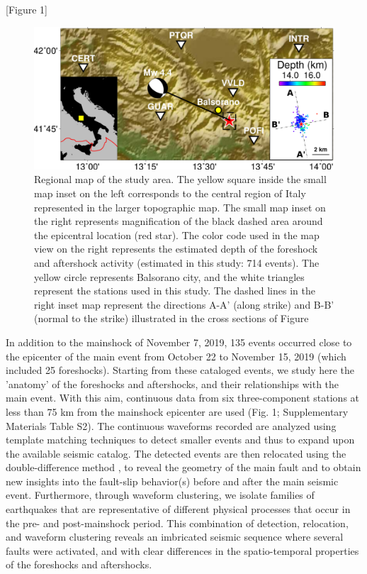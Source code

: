 \documentclass[a4paper,12pt,twoside]{article}
\begin{document}
\begin{center}
   [Figure 1]
\end{center}


\begin{figure}
    \centering
     \includegraphics[width=1\linewidth]{map_balsorano.pdf}
    \caption{Regional map of the study area. The yellow square inside the small map inset on the left corresponds to the central region of Italy represented in the larger topographic map. The small map inset on the right represents magnification of the black dashed area around the epicentral location (red star). The color code used in the map view on the right represents the estimated depth of the foreshock and aftershock activity (estimated in this study: 714 events). The yellow circle represents Balsorano city, and the white triangles represent the stations used in this study. The dashed lines in the right inset map represent the directions A-A' (along strike) and B-B' (normal to the strike) illustrated in the cross sections of Figure \protect{} \protect{}}
\end{figure}    \label{fig:general_map}

In addition to the mainshock of November 7, 2019, 135 events occurred close to the epicenter of the main event from October 22 to November 15, 2019 (which included 25 foreshocks). Starting from these cataloged events, we study here the 'anatomy' of the foreshocks and aftershocks, and their relationships with the main event. With this aim, continuous data from six three-component stations at less than 75 km from the mainshock epicenter are used (Fig. 1; Supplementary Materials Table S2). The continuous waveforms recorded are analyzed using template matching techniques \citep{Gibbons_2006_DLM, Shelly_2007_CET} to detect smaller events and thus to expand upon the available seismic catalog. The detected events are then relocated using the double-difference method \citep{Waldhauser_2001_HDD}, to reveal the geometry of the main fault and to obtain new insights into the fault-slip behavior(s) before and after the main seismic event. Furthermore, through waveform clustering, we isolate families of earthquakes that are representative of different physical processes that occur in the pre- and post-mainshock period. This combination of detection, relocation, and waveform clustering reveals an imbricated seismic sequence where several faults were activated, and with clear differences in the spatio-temporal properties of the foreshocks and aftershocks.
\end{document}
